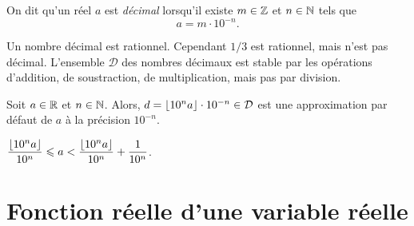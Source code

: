 \documentclass{magnolia}
\begin{document}
\begin{definition}[utile=-3]
On dit qu'un réel $a$ est \emph{décimal} lorsqu'il existe $m\in\mathbb{Z}$ et $n\in\mathbb{N}$ tels
que
\[a=m\cdot 10^{-n}.\]
\end{definition}

\begin{remarques}
\remarque Un nombre décimal est rationnel. Cependant $1/3$ est rationnel, mais
  n'est pas décimal.
\remarque L'ensemble $\mathcal{D}$ des nombres décimaux est stable par les
  opérations d'addition, de soustraction, de multiplication, mais pas par
  division.
\end{remarques}

\begin{proposition}
Soit $a\in\mathbb{R}$ et $n\in\mathbb{N}$. Alors, $d=\left\lfloor10^n a\right\rfloor\cdot 10^{-n}\in\mathcal{D}$
est une approximation par défaut de $a$ à la précision $10^{-n}$.
\end{proposition}

\begin{preuve}
$\dfrac{\left\lfloor10^na\right\rfloor}{10^n}\leqslant a< \dfrac{\left\lfloor10^na\right\rfloor}{10^n}+\dfrac{1}{10^n}$.
\end{preuve}



\section{Fonction réelle d'une variable réelle}
\end{document}
